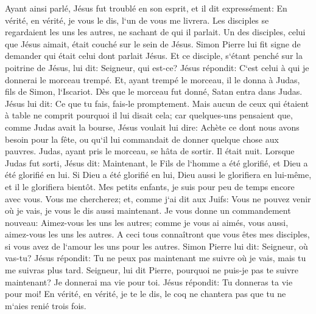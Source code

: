 \verse Ayant ainsi parlé, Jésus fut troublé en son esprit, et il dit expressément: En vérité, en vérité, je vous le dis, l`un de vous me livrera. 
\verse Les disciples se regardaient les uns les autres, ne sachant de qui il parlait. 
\verse Un des disciples, celui que Jésus aimait, était couché sur le sein de Jésus. 
\verse Simon Pierre lui fit signe de demander qui était celui dont parlait Jésus. 
\verse Et ce disciple, s`étant penché sur la poitrine de Jésus, lui dit: Seigneur, qui est-ce? 
\verse Jésus répondit: C`est celui à qui je donnerai le morceau trempé. Et, ayant trempé le morceau, il le donna à Judas, fils de Simon, l`Iscariot. 
\verse Dès que le morceau fut donné, Satan entra dans Judas. Jésus lui dit: Ce que tu fais, fais-le promptement. 
\verse Mais aucun de ceux qui étaient à table ne comprit pourquoi il lui disait cela; 
\verse car quelques-uns pensaient que, comme Judas avait la bourse, Jésus voulait lui dire: Achète ce dont nous avons besoin pour la fête, ou qu`il lui commandait de donner quelque chose aux pauvres. 
\verse Judas, ayant pris le morceau, se hâta de sortir. Il était nuit. 
\verse Lorsque Judas fut sorti, Jésus dit: Maintenant, le Fils de l`homme a été glorifié, et Dieu a été glorifié en lui. 
\verse Si Dieu a été glorifié en lui, Dieu aussi le glorifiera en lui-même, et il le glorifiera bientôt. 
\verse Mes petits enfants, je suis pour peu de temps encore avec vous. Vous me chercherez; et, comme j`ai dit aux Juifs: Vous ne pouvez venir où je vais, je vous le dis aussi maintenant. 
\verse Je vous donne un commandement nouveau: Aimez-vous les uns les autres; comme je vous ai aimés, vous aussi, aimez-vous les uns les autres. 
\verse A ceci tous connaîtront que vous êtes mes disciples, si vous avez de l`amour les uns pour les autres. 
\verse Simon Pierre lui dit: Seigneur, où vas-tu? Jésus répondit: Tu ne peux pas maintenant me suivre où je vais, mais tu me suivras plus tard. 
\verse Seigneur, lui dit Pierre, pourquoi ne puis-je pas te suivre maintenant? Je donnerai ma vie pour toi. 
\verse Jésus répondit: Tu donneras ta vie pour moi! En vérité, en vérité, je te le dis, le coq ne chantera pas que tu ne m`aies renié trois fois. 

